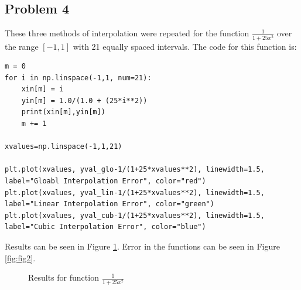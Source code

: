 \documentclass[aps,prb,groupedaddress,nofootinbib,floatfix]{revtex4}
\begin{document}
\subsection*{Problem 4} 
These three methods of interpolation were repeated for the function $\frac{1}{1+25x^{2}}$ over the range $[-1,1]$ with 21 equally spaced intervals. The code for this function is:
\begin{lstlisting}
m = 0
for i in np.linspace(-1,1, num=21):
    xin[m] = i
    yin[m] = 1.0/(1.0 + (25*i**2))
    print(xin[m],yin[m])
    m += 1

xvalues=np.linspace(-1,1,21)

plt.plot(xvalues, yval_glo-1/(1+25*xvalues**2), linewidth=1.5, label="Gloabl Interpolation Error", color="red")
plt.plot(xvalues, yval_lin-1/(1+25*xvalues**2), linewidth=1.5, label="Linear Interpolation Error", color="green")
plt.plot(xvalues, yval_cub-1/(1+25*xvalues**2), linewidth=1.5, label="Cubic Interpolation Error", color="blue")
\end{lstlisting}
Results can be seen in Figure \ref{fig:fig1}. Error in the functions can be seen in Figure \ref{fig:fig2}.
\begin{figure}
	\centering
	\qquad
	\caption{Results for function $\frac{1}{1+25x^{2}}$}
	\label{fig:fig1}
\end{figure}
\end{document}
